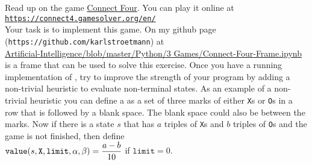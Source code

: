 \exercise
Read up on the game \href{https://en.wikipedia.org/wiki/Connect_Four}{Connect Four}.  You can play it online at
\\[0.2cm]
\hspace*{1.3cm}
\href{https://connect4.gamesolver.org/en/}{\texttt{https://connect4.gamesolver.org/en/}}
\\[0.2cm]
Your task is to implement this game.  On my github page (\texttt{https://github.com/karlstroetmann}) at
\\
\hspace*{1.3cm}
\href{https://github.com/karlstroetmann/Artificial-Intelligence/blob/master/Python/3
  Games/Connect-Four-Frame.ipynb}{Artificial-Intelligence/blob/master/Python/3 Games/Connect-Four-Frame.ipynb} 
\\[0.2cm]
is a frame  that can be used to solve this exercise.  
Once you have a running implementation of , try to improve the strength of your program by
adding a non-trivial heuristic to evaluate non-terminal states.  As an example of a non-trivial heuristic you
can define a  as a set of three marks of either \texttt{X}s or \texttt{O}s in a row that is
followed by a blank space.  The blank space could also be between the marks.  Now if there is a state $s$ that
has $a$ triples of \texttt{X}s and $b$ triples of \texttt{O}s and the game is not finished, then define
\\[0.2cm]
\hspace*{1.3cm}
$\displaystyle \texttt{value}(s, \texttt{X}, \texttt{limit}, \alpha, \beta) = \frac{a - b}{10}$ \quad if $\texttt{limit} = 0$.
\eox

